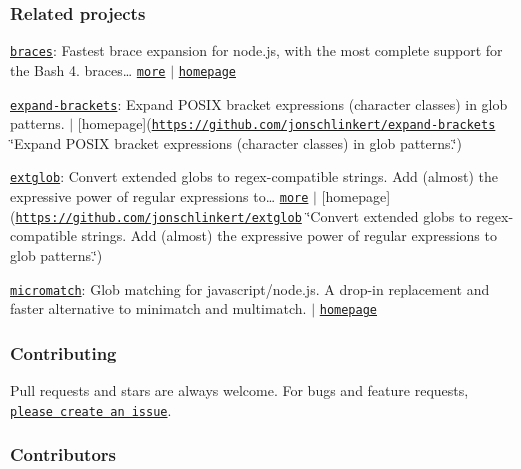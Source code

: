 \subsubsection*{Related projects}


\begin{DoxyItemize}
\item \href{https://www.npmjs.com/package/braces}{\tt braces}\+: Fastest brace expansion for node.\+js, with the most complete support for the Bash 4. braces… \href{https://github.com/jonschlinkert/braces}{\tt more} $\vert$ \href{https://github.com/jonschlinkert/braces}{\tt homepage}
\item \href{https://www.npmjs.com/package/expand-brackets}{\tt expand-\/brackets}\+: Expand P\+O\+S\+IX bracket expressions (character classes) in glob patterns. $\vert$ \mbox{[}homepage\mbox{]}(\href{https://github.com/jonschlinkert/expand-brackets}{\tt https\+://github.\+com/jonschlinkert/expand-\/brackets} \char`\"{}\+Expand P\+O\+S\+I\+X bracket expressions (character classes) in glob patterns.\char`\"{})
\item \href{https://www.npmjs.com/package/extglob}{\tt extglob}\+: Convert extended globs to regex-\/compatible strings. Add (almost) the expressive power of regular expressions to… \href{https://github.com/jonschlinkert/extglob}{\tt more} $\vert$ \mbox{[}homepage\mbox{]}(\href{https://github.com/jonschlinkert/extglob}{\tt https\+://github.\+com/jonschlinkert/extglob} \char`\"{}\+Convert extended globs to regex-\/compatible strings. Add (almost) the expressive power of regular expressions to glob patterns.\char`\"{})
\item \href{https://www.npmjs.com/package/micromatch}{\tt micromatch}\+: Glob matching for javascript/node.\+js. A drop-\/in replacement and faster alternative to minimatch and multimatch. $\vert$ \href{https://github.com/jonschlinkert/micromatch}{\tt homepage}
\end{DoxyItemize}

\subsubsection*{Contributing}

Pull requests and stars are always welcome. For bugs and feature requests, \href{../../issues/new}{\tt please create an issue}.

\subsubsection*{Contributors}

